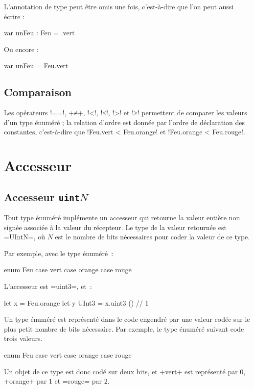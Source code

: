 L'annotation de type peut être omis une fois, c'est-à-dire que l'on peut aussi écrire :
\begin{PLM}
var unFeu : Feu = .vert
\end{PLM}

Ou encore :
\begin{PLM}
var unFeu = Feu.vert
\end{PLM}

\subsection{Comparaison}

Les opérateurs \plm!==!, \plm+≠+, \plm!<!, \plm!≤!, \plm!>! et \plm!≥! permettent de comparer les valeurs d'un type énuméré ; la relation d'ordre est donnée par l'ordre de déclaration des constantes, c'est-à-dire que \plm!Feu.vert < Feu.orange! et \plm!Feu.orange < Feu.rouge!.







\section{Accesseur}

\subsection{Accesseur \texttt{uint$N$}}

Tout type énuméré implémente un accesseur qui retourne la valeur entière non signée associée à la valeur du récepteur. Le type de la valeur retournée est \plm=UIntN=, où $N$ est le nombre de bits nécessaires pour coder la valeur de ce type.

Par exemple, avec le type énuméré~:
\begin{PLM}
enum Feu {
  case vert
  case orange
  case rouge
}
\end{PLM}

L'accesseur est \plm=uint3=, et~:
\begin{PLM}
let x = Feu.orange
let y UInt3 = x.uint3 () // 1
\end{PLM}









Un type énuméré est représenté dans le code engendré par une valeur codée sur le plus petit nombre de bits nécessaire. Par exemple, le type énuméré suivant code trois valeurs.
\begin{PLM}
enum Feu {
  case vert
  case orange
  case rouge
}
\end{PLM}

Un objet de ce type est donc codé sur deux bits, et \plm+vert+ est représenté par $0$, \plm+orange+ par $1$ et \plm=rouge= par $2$.


